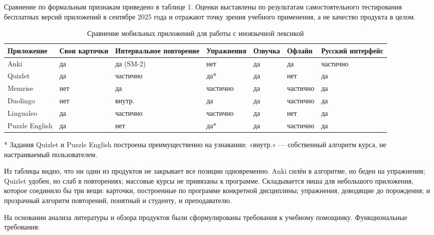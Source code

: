 \documentclass[11pt,a4paper,openany]{report}
\begin{document}
Сравнение по формальным признакам приведено в таблице 1. Оценки выставлены по результатам самостоятельного тестирования бесплатных версий приложений в сентябре 2025 года и отражают точку зрения учебного применения, а не качество продукта в целом.

\begin{table}[htbp]
\centering
\footnotesize
\caption{Сравнение мобильных приложений для работы с иноязычной лексикой}
\begin{tabular}{|p{3.0cm}|p{1.9cm}|p{2.2cm}|p{1.9cm}|p{1.5cm}|p{1.5cm}|p{2.2cm}|}
\hline
Приложение & Свои карточки & Интервальное повторение & Упражнения & Озвучка & Офлайн & Русский интерфейс \\
\hline
Anki & да & да (SM-2) & нет & да & да & частично \\
\hline
Quizlet & да & частично & да* & да & нет & да \\
\hline
Memrise & нет & да & частично & да & частично & да \\
\hline
Duolingo & нет & внутр. & да & да & частично & да \\
\hline
Lingualeo & да & частично & частично & да & нет & да \\
\hline
Puzzle English & да & нет & да* & да & частично & да \\
\hline
\end{tabular}
\end{table}

* Задания Quizlet и Puzzle English построены преимущественно на узнавании; «внутр.» — собственный алгоритм курса, не настраиваемый пользователем.

Из таблицы видно, что ни один из продуктов не закрывает все позиции одновременно. Anki силён в алгоритме, но беден на упражнения; Quizlet удобен, но слаб в повторениях; массовые курсы не привязаны к программе. Складывается ниша для небольшого приложения, которое соединило бы три вещи: карточки, построенные по программе конкретной дисциплины; упражнения, доводящие до порождения; и прозрачный алгоритм повторений, понятный и студенту, и преподавателю.

На основании анализа литературы и обзора продуктов были сформулированы требования к учебному помощнику. Функциональные требования:
\end{document}

